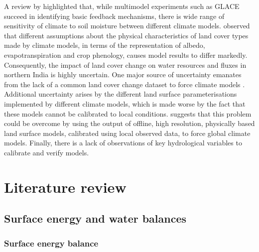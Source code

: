 \documentclass{icldt}\usepackage[]{graphicx}\usepackage[]{color}
\begin{document}
A review by \citet{Seneviratne2010} highlighted that, while multimodel experiments such as GLACE succeed in identifying basic feedback mechanisms, there is wide range of sensitivity of climate to soil moisture between different climate models. \citet{Pitman2009} observed that different assumptions about the physical characteristics of land cover types made by climate models, in terms of the representation of albedo, evapotranspiration and crop phenology, causes model results to differ markedly. Consequently, the impact of land cover change on water resources and fluxes in northern India is highly uncertain. One major source of uncertainty emanates from the lack of a common land cover change dataset to force climate models \citep{Pitman2009}. Additional uncertainty arises by the different land surface parameterisations implemented by different climate models, which is made worse by the fact that these models cannot be calibrated to local conditions. \citet{Seneviratne2010} suggests that this problem could be overcome by using the output of offline, high resolution, physically based land surface models, calibrated using local observed data, to force global climate models. Finally, there is a lack of observations of key hydrological variables to calibrate and verify models. \\






\chapter{Literature review}

\section{Surface energy and water balances}

\subsection{Surface energy balance}
\end{document}
